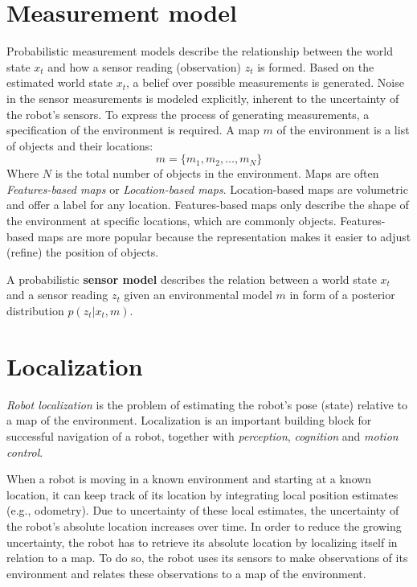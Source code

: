 		\section{Measurement model}
		\label{sec:measurement_model}
Probabilistic measurement models describe the relationship between the world state $x_t$ and how a sensor reading (observation) $z_t$ is formed.
Based on the estimated world state $x_t$, a belief over possible measurements is generated.
Noise in the sensor measurements is modeled explicitly, inherent to the uncertainty of the robot's sensors.
To express the process of generating measurements, a specification of the environment is required.
A map $m$ of the environment is a list of objects and their locations:
\begin{equation}
m = \{m_1, m_2, \hdots, m_N\}
\end{equation}
Where $N$ is the total number of objects in the environment.
Maps are often \textit{Features-based maps} or \textit{Location-based maps}.
Location-based maps are volumetric and offer a label for any location.
Features-based maps only describe the shape of the environment at specific locations, which are commonly objects.
Features-based maps are more popular because the representation makes it easier to adjust (refine) the position of objects.
\begin{mydef}
A probabilistic \textbf{sensor model} describes the relation between a world state $x_t$ and a sensor reading $z_t$ given an environmental model $m$ in form of a posterior distribution $p (z_t | x_t, m)$.
\end{mydef}


		\section{Localization}
\label{sec:probabilistic-robotics-localization}
\textit{Robot localization} is the problem of estimating the robot's pose (state) relative to a map of the environment.
Localization is an important building block for successful navigation of a robot, together with \textit{perception}, \textit{cognition} and \textit{motion control}.

When a robot is moving in a known environment and starting at a known location, it can keep track of its location by integrating local position estimates (e.g., odometry).
Due to uncertainty of these local estimates, the uncertainty of the robot's absolute location increases over time.
In order to reduce the growing uncertainty, the robot has to retrieve its absolute location by localizing itself in relation to a map.
To do so, the robot uses its sensors to make observations of its environment and relates these observations to a map of the environment.

